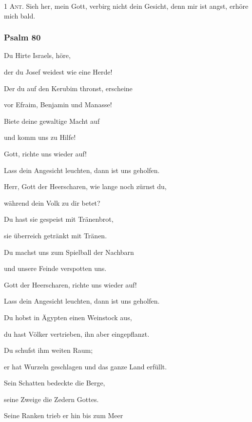 \noindent \textsc{1 Ant.} Sieh her, mein Gott, verbirg nicht dein Gesicht, denn mir ist angst, erhöre mich bald.

\subsubsection{Psalm 80}

\noindent Du Hirte Israels, höre,~\GreStar{}~\nopagebreak

der du Josef weidest wie eine Herde!

\noindent Der du auf den Kerubim thronst, erscheine~\GreStar{}~\nopagebreak

vor Efraim, Benjamin und Manasse!

\noindent Biete deine gewaltige Macht auf~\GreStar{}~\nopagebreak

und komm uns zu Hilfe!

\noindent Gott, richte uns wieder auf!~\GreStar{}~\nopagebreak

Lass dein Angesicht leuchten, dann ist uns geholfen.

\noindent Herr, Gott der Heerscharen, wie lange noch zürnst du,~\GreStar{}~\nopagebreak

während dein Volk zu dir betet?

\noindent Du hast sie gespeist mit Tränenbrot,~\GreStar{}~\nopagebreak

sie überreich getränkt mit Tränen.

\noindent Du machst uns zum Spielball der Nachbarn~\GreStar{}~\nopagebreak

und unsere Feinde verspotten uns.

\noindent Gott der Heerscharen, richte uns wieder auf!~\GreStar{}~\nopagebreak

Lass dein Angesicht leuchten, dann ist uns geholfen.

\noindent Du hobst in Ägypten einen Weinstock aus,~\GreStar{}~\nopagebreak

du hast Völker vertrieben, ihn aber eingepflanzt.

\noindent Du schufst ihm weiten Raum;~\GreStar{}~\nopagebreak

er hat Wurzeln geschlagen und das ganze Land erfüllt.

\noindent Sein Schatten bedeckte die Berge,~\GreStar{}~\nopagebreak

seine Zweige die Zedern Gottes.

\noindent Seine Ranken trieb er hin bis zum Meer~\GreStar{}~\nopagebreak

